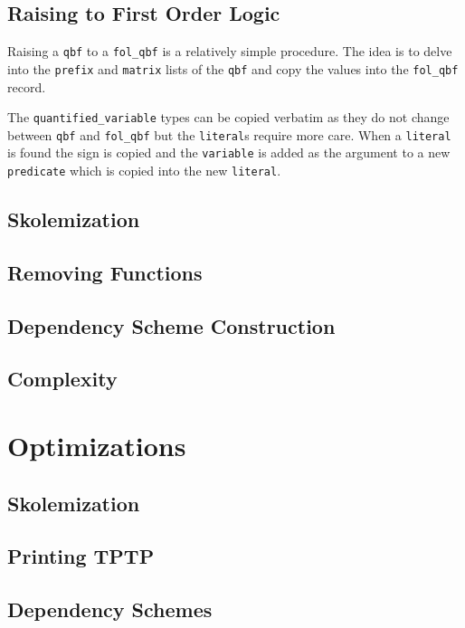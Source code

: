 \subsection{Raising to First Order Logic}
Raising a \texttt{qbf} to a \texttt{fol\_qbf} is a relatively simple procedure. The idea is to delve into the \texttt{prefix} and \texttt{matrix} lists of the \texttt{qbf} and copy the values into the \texttt{fol\_qbf} record.

The \texttt{quantified\_variable} types can be copied verbatim as they do not change between \texttt{qbf} and \texttt{fol\_qbf} but the \texttt{literal}s require more care. When a \texttt{literal} is found the sign is copied and the \texttt{variable} is added as the argument to a new \texttt{predicate} which is copied into the new \texttt{literal}.

\subsection{Skolemization}
\subsection{Removing Functions}
\subsection{Dependency Scheme Construction}
\subsection{Complexity}

\section{Optimizations} \label{optimizations}
\subsection{Skolemization}
\subsection{Printing TPTP}
\subsection{Dependency Schemes}
